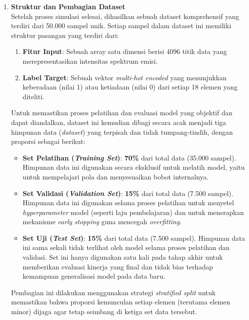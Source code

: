 \begin{enumerate}
    Proses pemodelan simulasi ini terdiri dari dua algoritma utama yang dijelaskan di lampiran. Pertama, sebuah rencana kombinasi sampel yang seimbang dan beragam dibuat menggunakan \textbf{Algoritma~\ref{app:algo1}}. Kemudian, setiap resep dari rencana tersebut dieksekusi untuk menghasilkan spektrum emisi akhir menggunakan \textbf{Algoritma~\ref{app:algo2}}, yang mencakup seluruh proses fisika mulai dari kalkulasi rasio ionisasi, intensitas garis, hingga pelebaran spektral.

    \item \textbf{Struktur dan Pembagian Dataset} \\
    Setelah proses simulasi selesai, dihasilkan sebuah dataset komprehensif yang terdiri dari 50.000 sampel unik. Setiap sampel dalam dataset ini memiliki struktur pasangan yang terdiri dari:
    \begin{enumerate}
      \item \textbf{Fitur Input}: Sebuah array satu dimensi berisi 4096 titik data yang merepresentasikan intensitas spektrum emisi.
      \item \textbf{Label Target}: Sebuah vektor \textit{multi-hot encoded} yang menunjukkan keberadaan (nilai 1) atau ketiadaan (nilai 0) dari setiap 18 elemen yang diteliti.
    \end{enumerate}

    Untuk memastikan proses pelatihan dan evaluasi model yang objektif dan dapat diandalkan, dataset ini kemudian dibagi secara acak menjadi tiga himpunan data (\textit{dataset}) yang terpisah dan tidak tumpang-tindih, dengan proporsi sebagai berikut:
    \begin{itemize}
        \item \textbf{Set Pelatihan (\textit{Training Set})}: \textbf{70\%} dari total data (35.000 sampel). Himpunan data ini digunakan secara eksklusif untuk melatih model, yaitu untuk mempelajari pola dan menyesuaikan bobot internalnya.
        \item \textbf{Set Validasi (\textit{Validation Set})}: \textbf{15\%} dari total data (7.500 sampel). Himpunan data ini digunakan selama proses pelatihan untuk menyetel \textit{hyperparameter} model (seperti laju pembelajaran) dan untuk menerapkan mekanisme \textit{early stopping} guna mencegah \textit{overfitting}.
        \item \textbf{Set Uji (\textit{Test Set})}: \textbf{15\%} dari total data (7.500 sampel). Himpunan data ini sama sekali tidak terlihat oleh model selama proses pelatihan dan validasi. Set ini hanya digunakan satu kali pada tahap akhir untuk memberikan evaluasi kinerja yang final dan tidak bias terhadap kemampuan generalisasi model pada data baru.
    \end{itemize}
    Pembagian ini dilakukan menggunakan strategi \textit{stratified split} untuk memastikan bahwa proporsi kemunculan setiap elemen (terutama elemen minor) dijaga agar tetap seimbang di ketiga set data tersebut.


\end{enumerate}

